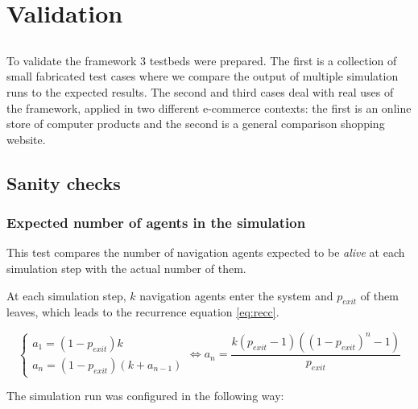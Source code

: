 \chapter{Validation} \label{chap:validation}

\section*{}

To validate the framework 3 testbeds were prepared. The first is a collection 
of small fabricated test cases where we compare the output of multiple 
simulation runs to the expected results. The second and third cases deal with 
real uses of the framework, applied in two different e-commerce contexts: the 
first is an online store of computer products and the second is a general 
comparison shopping website.


\section{Sanity checks} %

\subsection{Expected number of agents in the simulation}

This test compares the number of navigation agents expected to be 
\textit{alive} at each simulation step with the actual number of them.

At each simulation step, $k$ navigation agents enter the system and  
$p_{exit}$ of them leaves, which leads to the recurrence equation \ref{eq:recc}.

\begin{equation}\label{eq:recc}
\begin{cases}
a_{1} = \left (1 - p_{exit}  \right ) k\\
a_{n} = \left (1 - p_{exit}  \right ) \left (k + a_{n - 1} \right)
\end{cases} \Leftrightarrow a_{n} = \frac{k (p_{exit}-1) ((1-p_{exit})^{n} - 
1)}{p_{exit}}
\end{equation}

The simulation run was configured in the following way:

